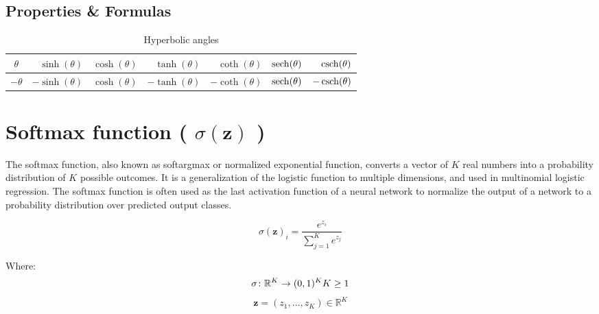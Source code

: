 \subsection{Properties \& Formulas}

\begin{table}[H]
    \centering
    \begin{tabular}{|c|r|r|r|r|r|r|}
        \hline
        $\theta$ & $\sinh(\theta)$ & $\cosh(\theta)$ & $\tanh(\theta)$ & $\coth(\theta)$ & $\operatorname{sech}(\theta)$ & $\operatorname{csch}(\theta)$ \\ \hline

        $-\theta$ & $-\sinh(\theta)$ & $\cosh(\theta)$ & $-\tanh(\theta)$ & $-\coth(\theta)$ & $\operatorname{sech}(\theta)$ & $-\operatorname{csch}(\theta)$ \\ \hline
    \end{tabular}
    \caption{Hyperbolic angles}
\end{table}

\section{Softmax function ( $\sigma (\mathbf {z})$ ) \cite{wiki-softmax-function}}\label{Softmax function}
The softmax function, also known as softargmax or normalized exponential function, converts a vector of $K$ real numbers into a probability distribution of $K$ possible outcomes. It is a generalization of the logistic function to multiple dimensions, and used in multinomial logistic regression. The softmax function is often used as the last activation function of a neural network to normalize the output of a network to a probability distribution over predicted output classes.

\[
    {\displaystyle \sigma (\mathbf {z} )_{i}={\displaystyle\frac {e^{z_{i}}}{\sum _{j=1}^{K}e^{z_{j}}}}}
\]

Where:
\[
    {\displaystyle \sigma \colon \mathbb {R} ^{K}\to (0,1)^{K}}
    \hfill
    {\displaystyle K\geq 1}
\]
\[
    {\displaystyle \mathbf {z} =(z_{1},\dotsc ,z_{K})\in \mathbb {R} ^{K}}
\]






















































